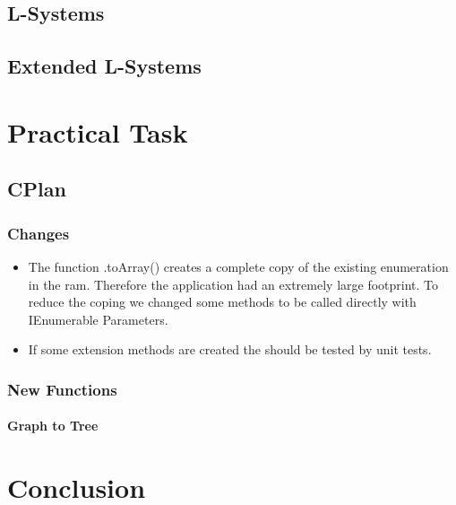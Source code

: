 \documentclass[11pt, a4paper]{report}
\begin{document}
\section{L-Systems}

\pagebreak
\section{Extended L-Systems}

\pagebreak
\chapter{Practical Task}
\section{CPlan}
\subsection{Changes}
\begin{itemize}
    \item The function .toArray() creates a complete copy of the existing enumeration in the ram. Therefore the application had an extremely large footprint. To reduce the coping we changed some methods to be called directly with IEnumerable Parameters.
    \item If some extension methods are created the should be tested by unit tests.
     
\end{itemize}


\subsection{New Functions}
\subsubsection{Graph to Tree}


\chapter{Conclusion}


\appendix
\glsaddall
\printglossaries
\end{document}
